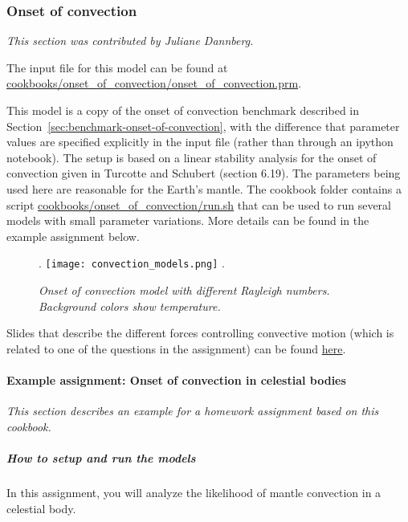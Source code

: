 \subsubsection{Onset of convection}
\label{sec:cookbooks-onset-of-convection}
\textit{This section was contributed by Juliane Dannberg.}

The input file for this model can be found at \url{cookbooks/onset_of_convection/onset_of_convection.prm}.

This model is a copy of the onset of convection benchmark described in Section~\ref{sec:benchmark-onset-of-convection}, 
with the difference that parameter values are specified explicitly in the input file (rather than through an ipython notebook). 
The setup is based on a linear stability analysis for the onset of convection given in Turcotte and Schubert \cite{TS14} (section 6.19).
The parameters being used here are reasonable for the Earth's mantle. The cookbook folder contains a script 
\url{cookbooks/onset_of_convection/run.sh} that can be used to run several models with small parameter variations.
More details can be found in the example assignment below. 

\begin{figure}[h]
\phantom.
\hfill
\texttt{[image: convection\_models.png]}
\hfill
\phantom.
\caption{\it Onset of convection model with different Rayleigh numbers. Background colors show temperature.}
\label{fig:convection-box-iterations}
\end{figure}

Slides that describe the different forces controlling convective motion (which is related to one of the questions
in the assignment) can be found \href{https://www.dropbox.com/s/0wqtg05w7713hdz/06_geophysics_lecture_01_29.pdf?dl=0}{here}.

\paragraph{Example assignment: Onset of convection in celestial bodies}
\textit{This section describes an example for a homework assignment based on this cookbook.}

\subparagraph{How to setup and run the models}

In this assignment, you will analyze the likelihood of mantle convection in a celestial body.

